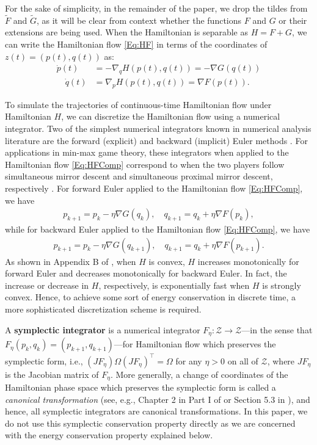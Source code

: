 \documentclass[11pt]{article}
\newcommand{\Z}{\mathcal{Z}}
\begin{document}
For the sake of simplicity, in the remainder of the paper, we drop the tildes from $\widetilde{F}$ and $\widetilde{G}$, as it will be clear from context whether the functions $F$ and $G$ or their extensions are being used. When the Hamiltonian is separable as $H=F+G$, we can write the Hamiltonian flow \eqref{Eq:HF} in terms of the coordinates of $z(t) = (p(t), q(t))$ as:
\begin{subequations}\label{Eq:HFComp}
    \begin{align}
        \dot{p}(t) &=-\nabla_{q}H(p(t),q(t)) = -\nabla G(q(t)) \\
        \quad \dot{q}(t) &=\nabla_{p}H(p(t),q(t)) = \nabla F(p(t)).
    \end{align}
\end{subequations}

To simulate the trajectories of continuous-time Hamiltonian flow under Hamiltonian $H$, we can discretize the Hamiltonian flow using a numerical integrator. Two of the simplest numerical integrators known in numerical analysis literature are the forward (explicit) and backward (implicit) Euler methods \citep{Atkinson}. For applications in min-max game theory, these integrators when applied to the Hamiltonian flow \eqref{Eq:HFComp} correspond to when the two players follow simultaneous mirror descent and simultaneous proximal mirror descent, respectively \citep{Wibisono2022}. 
For forward Euler applied to the Hamiltonian flow \eqref{Eq:HFComp}, we have
\begin{gather}
    p_{k+1} =p_{k}-\eta\nabla G\left(q_{k}\right), \quad q_{k+1} =q_{k}+\eta\nabla F\left(p_{k}\right),\label{forward}
\end{gather}
while for backward Euler applied to the Hamiltonian flow \eqref{Eq:HFComp}, we have
\begin{gather}
    p_{k+1} =p_{k}-\eta\nabla G\left(q_{k+1}\right), \quad q_{k+1} =q_{k}+\eta\nabla F\left(p_{k+1}\right).\label{backward}
\end{gather}
As shown in Appendix B of \cite{Wibisono2022}, when $H$ is convex, $H$ increases monotonically for forward Euler and decreases monotonically for backward Euler. In fact, the increase or decrease in $H$, respectively, is exponentially fast when $H$ is strongly convex. Hence, to achieve some sort of energy conservation in discrete time, a more sophisticated discretization scheme is required. 

A \textbf{symplectic integrator} is a numerical integrator $F_{\eta}:\Z\rightarrow\Z$---in the sense that $F_{\eta}\left(p_{k},q_{k}\right)=\left(p_{k+1},q_{k+1}\right)$---for Hamiltonian flow which preserves the symplectic form, i.e., $\left(JF_{\eta}\right)\Omega\left(JF_{\eta}\right)^{\top}=\Omega$ for any $\eta>0$ on all of $\Z$, where $JF_{\eta}$ is the Jacobian matrix of $F_{\eta}$. More generally, a change of coordinates of the Hamiltonian phase space which preserves the symplectic form is called a \textit{canonical transformation} (see, e.g., Chapter 2 in Part I of \cite{Lazutkin1993} or Section 5.3 in \cite{Jose1998}), and hence, all symplectic integrators are canonical transformations. In this paper, we do not use this symplectic conservation property directly as we are concerned with the energy conservation property explained below. 
\end{document}
